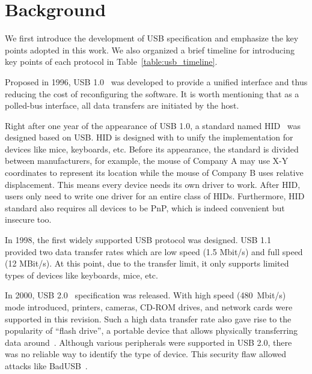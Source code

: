 \section{Background}
\label{sec:background}

We first introduce the development of \ac{USB} specification and emphasize the key
points adopted in this work. We also organized a brief timeline for introducing
key points of each protocol in Table~\ref{table:usb_timeline}.

Proposed in 1996, \ac{USB} 1.0~\cite{usb10} was developed to provide a unified
interface and thus reducing the cost of reconfiguring the software. It is
worth mentioning that as a polled-bus interface, all data transfers are
initiated by the host.

Right after one year of the appearance of \ac{USB} 1.0, a standard named \acf{HID}~\cite{hid} was designed based on \ac{USB}. \ac{HID} is
designed with to unify the implementation for devices like mice,
keyboards, etc. Before its appearance, the standard is divided between
manufacturers, for example, the mouse of Company A may use X-Y coordinates to
represent its location while the mouse of Company B uses relative displacement.
This means every device needs its own driver to work. After \ac{HID}, users only need to
write one driver for an entire class of \acp{HID}. Furthermore, \ac{HID} standard also
requires all devices to be \ac{PnP}, which is indeed
convenient but insecure too.

In 1998, the first widely supported \ac{USB} protocol was designed. \ac{USB} 1.1~\cite{usb11}
provided two data transfer rates which are low speed (1.5 Mbit/s) and full
speed (12 MBit/s). At this point, due to the transfer limit, it only supports
limited types of devices like keyboards, mice, etc.

In 2000, \ac{USB} 2.0~\cite{usb20} specification was released. With high speed \mbox{(480
Mbit/s)} mode introduced, printers, cameras, CD-ROM drives, and network cards were
supported in this revision. Such a high data transfer rate also gave rise to the
popularity of ``flash drive'', a portable device that allows physically
transferring data around~\cite{sok}. Although various peripherals were supported
in \ac{USB} 2.0, there was no reliable way to identify the type of device. This
security flaw allowed attacks like BadUSB~\cite{badusb,rubber}.

